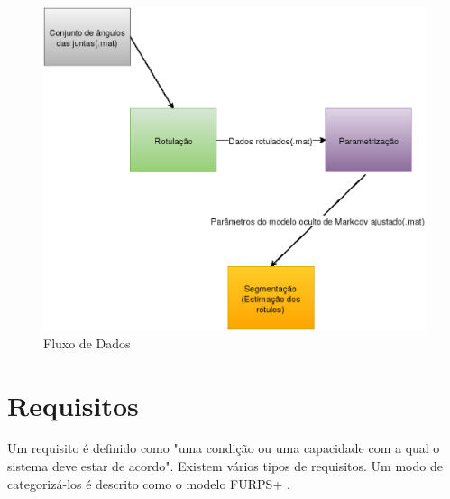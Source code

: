   \begin{figure}[H]
  \centering
  \includegraphics [keepaspectratio=true,scale=0.60]{figuras/diagramProt.eps}
  \caption{Fluxo de Dados}
  \label{diagramProt}

  \end{figure}


  \section {Requisitos}
  \label{Sec:Requisitos}
    Um requisito é definido como "uma condição ou uma capacidade com a qual o
  sistema deve estar de acordo". Existem vários tipos de
  requisitos. Um modo de categorizá-los é descrito como o modelo
  FURPS+ \cite{robertGrady}.

